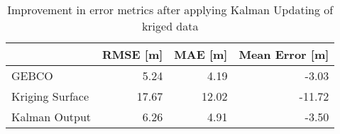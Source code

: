 \begin{table}
\centering
\caption{Improvement in error metrics after applying Kalman Updating of kriged data}
\label{tab:oahu6_gebco_raster_error}
\begin{tabular}{lrrr}
\toprule
 & RMSE [m] & MAE [m] & Mean Error [m] \\
\midrule
GEBCO & 5.24 & 4.19 & -3.03 \\
Kriging Surface & 17.67 & 12.02 & -11.72 \\
Kalman Output & 6.26 & 4.91 & -3.50 \\
\bottomrule
\end{tabular}
\end{table}
